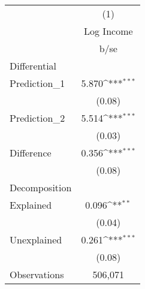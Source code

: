 {
\def\sym#1{\ifmmode^{#1}\else\(^{#1}\)\fi}
\begin{tabular}{l*{1}{c}}
\hline\hline
                    &\multicolumn{1}{c}{(1)}\\
                    &\multicolumn{1}{c}{Log Income}\\
                    &        b/se         \\
\hline
Differential        &                     \\
Prediction\_1        &       5.870\sym{***}\\
                    &      (0.08)         \\
Prediction\_2        &       5.514\sym{***}\\
                    &      (0.03)         \\
Difference          &       0.356\sym{***}\\
                    &      (0.08)         \\
\hline
Decomposition       &                     \\
Explained           &       0.096\sym{**} \\
                    &      (0.04)         \\
Unexplained         &       0.261\sym{***}\\
                    &      (0.08)         \\
\hline
Observations        &     506,071         \\
\hline\hline
\end{tabular}
}
